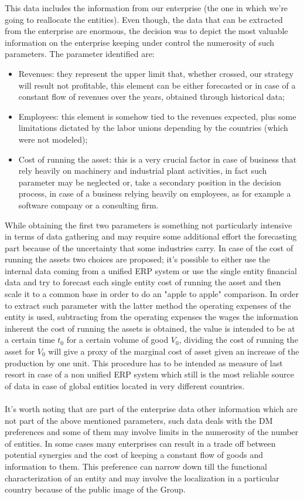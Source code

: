 \documentclass{article}
\begin{document}
This data includes the information from our enterprise (the one in which we're going to reallocate the entities). Even though, the data that can be extracted from the enterprise are enormous, the decision was to depict the most valuable information on the enterprise keeping under control the numerosity of such parameters. The parameter identified are: 
\begin{itemize}
	\item Revenues: they represent the upper limit that, whether crossed, our strategy will result not profitable, this element can be either forecasted or in case of a constant flow of revenues over the years, obtained through historical data;
	\item Employees: this element is somehow tied to the revenues expected, plus some limitations dictated by the labor unions depending by the countries (which were not modeled);
	\item Cost of running the asset: this is a very crucial factor in case of business that rely heavily on machinery and industrial plant activities, in fact such parameter may be neglected or, take a secondary position in the decision process, in case of a business relying heavily on employees, as for example a software company or a consulting firm.
\end{itemize}

While obtaining the first two parameters is something not particularly intensive in terms of data gathering and may require some additional effort the forecasting part because of the uncertainty that some industries carry. In case of the cost of running the assets two choices are proposed; it's possible to either use the internal data coming from a unified ERP system or use the single entity financial data and try to forecast each single entity cost of running the asset and then scale it to a common base in order to do an "apple to apple" comparison. In order to extract such parameter with the latter method the  operating expenses of the entity\cite{williams_financial_2008} is used, subtracting from the operating expenses the wages the information inherent the cost of running the assets is obtained, the value is intended to be at a certain time $t_0$ for a certain volume of good $V_0$, dividing the cost of running the asset for $V_0$ will give a proxy of the marginal cost of asset given an increase of the production by one unit. This procedure has to be intended as measure of last resort in case of a non unified ERP system which still is the most reliable source of data in case of global entities located in very different countries. 
\\
\\
It's worth noting that are part of the enterprise data other information which are not part of the above mentioned parameters, such data deals with the DM preferences and some of them may involve limits in the numerosity of the number of entities. In some cases many enterprises can result in a trade off between potential synergies and the cost of keeping a constant flow of goods and information to them. This preference can narrow down till the functional characterization of an entity and may involve the localization in a particular country because of the public image of the Group.
\end{document}
